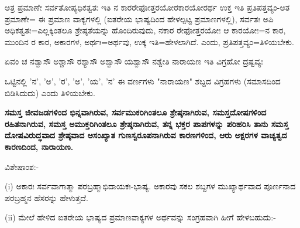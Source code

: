 ಅತ್ರ ಪ್ರಮಾಣೇ ಸರ್ವತೋಪ್ಯಧಿಕತ್ವತಃ ಇತಿ ನ ಕಾರರೇಫೋತ್ತರಯೋರಕಾರಯೋರರ್ಥ ಉಕ್ತ ಇತಿ ಪ್ರತಿಪತ್ತವ್ಯಂ-ಅತ ಪ್ರಮಾಣೇ= ಈ ಪ್ರಮಾಣ ವಾಕ್ಯಗಳಲ್ಲಿ (ಐತರೇಯ ಭಾಷ್ಯದಿಂದ ಹೇಳಲ್ಪಟ್ಟ ಪ್ರಮಾಣಗಳಲ್ಲಿ), ಸರ್ವತಃ ಅಪಿ ಅಧಿಕತ್ವತಃ=ಎಲ್ಲಕ್ಕಿಂತಲೂ ಶ್ರೇಷ್ಠತೆಯನ್ನು ಹೊಂದಿರುವುದು, ನಕಾರ ರೇಫೋತ್ತರಯೋಃ ಆ ಕಾರಯೋಃ=ನ ಕಾರ, ಮುಂದಿನ ರ ಕಾರ, ಅಕಾರಗಳ, ಅರ್ಥಃ=ಅರ್ಥವು, ಉಕ್ಕ ಇತಿ=ಹೇಳಲಾಗಿದೆ. ಎಂದು, ಪ್ರತಿಪತ್ತವ್ಯಂ=ತಿಳಿಯಬೇಕು.

ಏವಂ ಚ ನಶ್ವಾಸೌ ಅಶ್ಚಾಸೌ ರಶ್ಯಾಸೌ ಅಶ್ವಾಸೌ ಯಶ್ವಾಸೌ ನಶ್ವೇತಿ ನಾರಾಯಣ ಇತಿ ವಿಗ್ರಹೋ ದ್ರಷ್ಟವ್ಯಃ

ಒಟ್ಟಿನಲ್ಲಿ 'ನ', 'ಅ', 'ರ', 'ಅ', 'ಯ', 'ನ' ಈ ವರ್ಣಗಳು "ನಾರಾಯಣ" ಶಬ್ದದ ವಿಗ್ರಹಗಳು (ಸಮಾಸದಿಂದ ಬಿಡಿಸಿದುದು) ಎಂದು ತಿಳಿಯಬೇಕು.

\textbf{ಸಮಸ್ತ ಜೀವಜಡಗಳಿಂದ ಭಿನ್ನವಾಗಿರುವ, ಸರ್ವಮುಕರಿಗಿಂತಲೂ ಶ್ರೇಷ್ಠನಾಗಿರುವ, ಸಮಸ್ತದೋಷಗಳಿಂದ ರಹಿತನಾಗಿರುವ, ಸಮಸ್ತ ಅಮುಕ್ತರಿಗಿಂತಲೂ ಶ್ರೇಷ್ಠನಾಗಿರುವ, ತನ್ನ ಭಕ್ತರ ಪಾಪಗಳನ್ನು ಪರಿಹರಿಸಿ ತಾನು ಸಮಸ್ತ ದೋಷವಿರುದ್ಧವಾದ ಶ್ರೇಷ್ಠವಾದ ಅಸಂಖ್ಯಾತ ಗುಣಸ್ವರೂಪನಾಗಿರುವ ಕಾರಣಗಳಿಂದ, ಆರು ಅಕ್ಷರಗಳ ವಾಚ್ಯತ್ವದ ಕಾರಣದಿಂದ, ನಾರಾಯಣ.}

\noindent
ವಿಶೇಷಾಂಶ:-

(i) ಅಕಾರಃ ಸರ್ವವಾಗಾತ್ಮಾ ಪರಬ್ರಹ್ಮಾಭಿದಾಯಕಃ-ಭಾಷ್ಯ. ಅಕಾರವು ಸಕಲ ಶಬ್ದಗಳ ಮುಖ್ಯಾರ್ಥವಾದ ಪೂರ್ಣನಾದ ಪರಬ್ರಹ್ಮನ ಹೆಸರನ್ನು ಹೇಳುತ್ತದೆ.

(ii) ಮೇಲೆ ಹೇಳಿದ ಐತರೇಯ ಭಾಷ್ಯದ ಪ್ರಮಾಣವಾಕ್ಯಗಳ ಅರ್ಥವನ್ನು ಸಂಗ್ರಹವಾಗಿ ಹೀಗೆ ಹೇಳಬಹುದು:-

